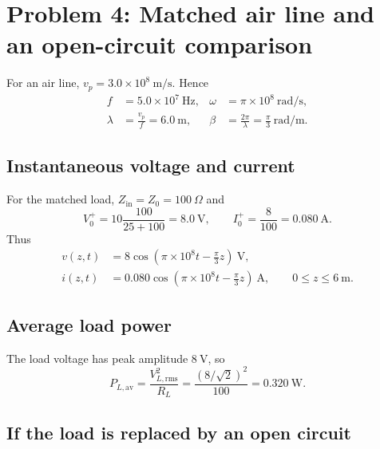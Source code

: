 \documentclass[12pt,a4paper]{article}
\begin{document}

\section{Problem 4: Matched air line and an open-circuit comparison}


For an air line, $v_p=3.0\times10^8~\mathrm{m/s}$.  Hence
\begin{align*}
f&=5.0\times10^7~\mathrm{Hz}, & \omega&=\pi\times10^8~\mathrm{rad/s},\\
\lambda&=\frac{v_p}{f}=6.0~\mathrm{m}, &
\beta&=\frac{2\pi}{\lambda}=\frac{\pi}{3}~\mathrm{rad/m}.
\end{align*}

\subsection{Instantaneous voltage and current}

For the matched load, $Z_{\mathrm{in}}=Z_0=100~\Omega$ and
\[
V_0^+=10\frac{100}{25+100}=8.0~\mathrm{V},
\qquad I_0^+=\frac{8}{100}=0.080~\mathrm{A}.
\]
Thus
\begin{align}
v(z,t)&=8\cos\left(\pi\times10^8t-\frac{\pi}{3}z\right)~\mathrm{V},\\
i(z,t)&=0.080\cos\left(\pi\times10^8t-\frac{\pi}{3}z\right)~\mathrm{A},
\qquad 0\le z\le6~\mathrm{m}.
\end{align}

\subsection{Average load power}

The load voltage has peak amplitude $8~\mathrm{V}$, so
\begin{equation}
P_{L,\mathrm{av}}=\frac{V_{L,\mathrm{rms}}^2}{R_L}
=\frac{(8/\sqrt2)^2}{100}=0.320~\mathrm{W}.
\end{equation}

\subsection{If the load is replaced by an open circuit}
\end{document}
